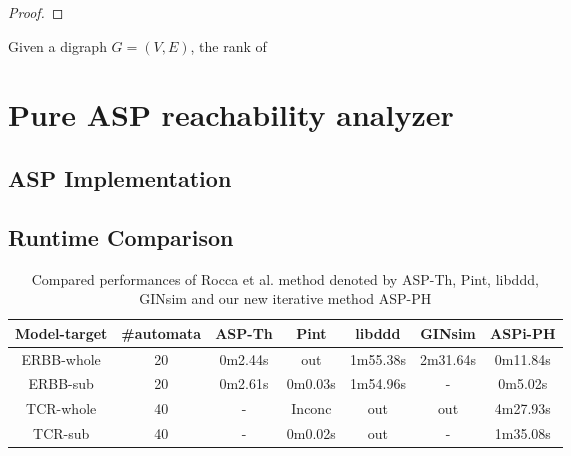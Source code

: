 \begin{theorem}\label{th:underapprox}
    \begin{proof}
    \end{proof}
\end{theorem}

\begin{definition}
Given a digraph $G=(V,E)$, the rank of 

\end{definition}


\chapter{Pure ASP reachability analyzer}
\section{ASP Implementation}
\section{Runtime Comparison}
\cite{abdallah2015exhaustive}
\begin{table}[ht]
    \centering
    \footnotesize
    \begin{tabular}{c|c|c|c|c|c|c}
        Model-target & \#automata & ASP-Th & Pint & libddd & GINsim & ASPi-PH\\
        \hline
        ERBB-whole & 20& 0m2.44s& out& 1m55.38s& 2m31.64s& 0m11.84s\\
        \hline
        ERBB-sub& 20& 0m2.61s& 0m0.03s& 1m54.96s& -& 0m5.02s\\
        \hline
        TCR-whole& 40& - &Inconc& out& out& 4m27.93s\\
        \hline
        TCR-sub& 40 &- &0m0.02s& out& -& 1m35.08s
    \end{tabular}
    \caption[Performance of pure ASP method]{Compared performances of Rocca et al. method \cite{rocca2014asp} denoted by ASP-Th, Pint, libddd, GINsim and our new iterative method ASP-PH}
    \label{tab:pureAsp}
\end{table}